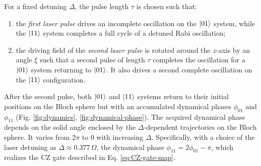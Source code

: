 \documentclass[rmp,10pt,onecolumn,fleqn,notitlepage]{revtex4-1}
\begin{document}
For a fixed detuning $\Delta$, the pulse length $\tau$ is chosen such that:
\begin{enumerate}
    \item the \textit{first laser pulse} drives an incomplete oscillation on the $\left\vert{01}\right\rangle$ system, while the $\left\vert{11}\right\rangle$ system completes a full cycle of a detuned Rabi oscillation;
    
    \item the driving field of the \textit{second laser pulse} is rotated around the $z$-axis by an angle $\xi$ such that a second pulse of length $\tau$ completes the oscillation for a $\left\vert{01}\right\rangle$ system returning to $\left\vert{01}\right\rangle$. It also drives a second complete oscillation on the $\left\vert{11}\right\rangle$ configuration.
\end{enumerate}

After the second pulse, both $\left\vert{01}\right\rangle$ and $\left\vert{11}\right\rangle$ systems return to their initial positions on the Bloch sphere but with an accumulated dynamical phases $\phi_{01}$ and $\phi_{11}$ (Fig. \ref{fig:dynamics}, \ref{fig:dynamical-phase}). The acquired dynamical phase depends on the solid angle enclosed by the $\Delta$-dependent trajectories on the Bloch sphere. It varies from $2\pi$ to 0 with increasing $\Delta$. Specifically, with a choice of the laser detuning as $\Delta \approx 0.377 \, \Omega$, the dynamical phase $\phi_{11}=2\phi_{01}-\pi$, which realizes the CZ gate described in Eq. \eqref{eq:CZ-gate-map}.
\end{document}
